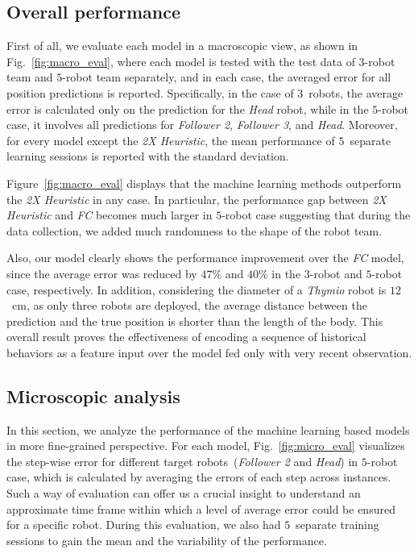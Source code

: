 \documentclass[letterpaper, 10 pt, conference]{ieeeconf}  %
\begin{document}
	\subsection{Overall performance}
	\label{sec:overall_performance}

	First of all, we evaluate each model in a macroscopic view, as shown in
	Fig.~\ref{fig:macro_eval}, where each model is tested with the
	test data of $3$-robot team and $5$-robot team separately, and in each case,
	the averaged error for all position predictions is reported.
	Specifically, in the case of $3$~robots, the average error is calculated only on
	the prediction for the \emph{Head} robot, while in the $5$-robot case,
	it involves all predictions for \emph{Follower 2}, \emph{Follower 3}, and \emph{Head}.
	Moreover, for every model except the \emph{2X Heuristic}, the mean performance of
	$5$~separate learning sessions is reported with the standard deviation.

	Figure~\ref{fig:macro_eval} displays that the machine learning methods outperform
	the \emph{2X Heuristic} in any case. In particular, the performance gap between
	\emph{2X Heuristic} and \emph{FC} becomes much larger in $5$-robot case suggesting that
	during the data collection, we added much randomness to the shape of the robot team.

	Also, our model clearly shows the performance improvement over the \emph{FC} model, since
	the average error was reduced by $47\%$ and $40\%$ in the $3$-robot and $5$-robot case,
	respectively. In addition, considering the diameter of a \emph{Thymio} robot is
	$12$~cm, as only three robots are deployed, the average distance between the prediction
	and the true position is shorter than the length of the body. This overall result proves
	the effectiveness of encoding a sequence of historical behaviors as a feature input
	over the model fed only with very recent observation.


	\subsection{Microscopic analysis}
	\label{sec:microscopic_analysis}

	In this section, we analyze the performance of the machine learning based models
	in more fine-grained perspective. For each model, Fig.~\ref{fig:micro_eval} visualizes the
	step-wise error for different target robots~(\emph{Follower 2} and \emph{Head})
	in $5$-robot case, which is calculated by averaging the errors of each step across instances.
	Such a way of evaluation can offer us a crucial insight to understand an approximate time frame
	within which a level of average error could be ensured for a specific robot. During this
	evaluation, we also had $5$~separate training sessions to gain the mean and the variability
	of the performance.
\end{document}
